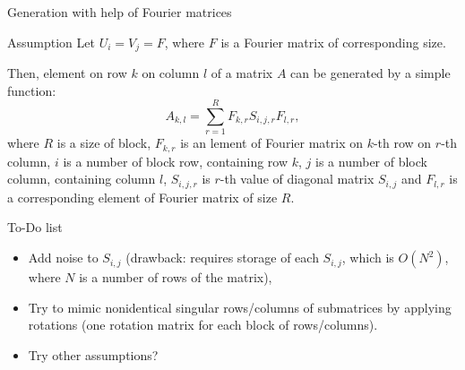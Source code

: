 \documentclass{beamer}
\begin{document}
\begin{frame}{Generation with help of Fourier matrices}
\begin{block}{Assumption}
Let $U_i=V_j=F$, where $F$ is a Fourier matrix of corresponding size.
\end{block}
Then, element on row $k$ on column $l$ of a matrix $A$ can be generated by a
simple function:
$$A_{k,l} = \sum_{r=1}^R F_{k,r} S_{i,j,r} F_{l,r},$$
where $R$ is a size of block, $F_{k,r}$ is an lement of Fourier matrix on
$k$-th row on $r$-th column, $i$ is a number of block row, containing row $k$,
$j$ is a number of block column, containing column $l$, $S_{i,j,r}$ is $r$-th
value of diagonal matrix $S_{i,j}$ and $F_{l,r}$ is a corresponding element of
Fourier matrix of size $R$.
\end{frame}

\begin{frame}{To-Do list}
\begin{itemize}
\item Add noise to $S_{i,j}$ (drawback: requires storage of each $S_{i,j}$,
which is $O(N^2)$, where $N$ is a number of rows of the matrix),
\item Try to mimic nonidentical singular rows/columns of submatrices by
applying rotations (one rotation matrix for each block of rows/columns).
\item Try other assumptions?
\end{itemize}
\end{frame}
\end{document}
